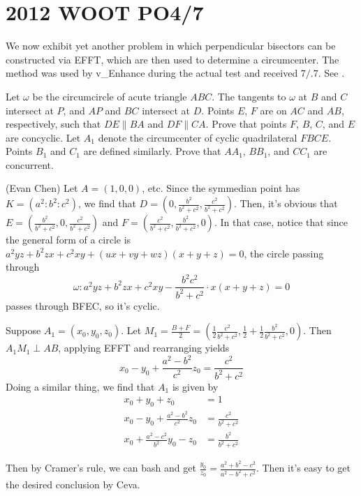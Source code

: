 \section{2012 WOOT PO4/7}
\label{exam:2012wootpo47}
We now exhibit yet another problem in which perpendicular bisectors can be constructed via EFFT, which are then used to determine a circumcenter.  The method was used by v\_Enhance during the actual test and received $7/.7$.  See \cite{woot}.

\secps
\begin{problem}[2012 WOOT PO4/7]
  Let $\omega$ be the circumcircle of acute triangle $ABC$.  The tangents to $\omega$ at $B$ and $C$ intersect at $P$, and $AP$ and $BC$ intersect at $D$.  Points $E$, $F$ are on $AC$ and $AB$, respectively, such that $DE \parallel BA$ and $DF \parallel CA$.
  \be[(a)]
  \ii Prove that points $F$, $B$, $C$, and $E$ are concyclic.
  \ii Let $A_1$ denote the circumcenter of cyclic quadrilateral $FBCE$.  Points $B_1$ and $C_1$ are defined similarly.  Prove that $AA_1$, $BB_1$, and $CC_1$ are concurrent.
  \ee
\end{problem}


\begin{soln}
  (Evan Chen) Let $A=(1,0,0)$, etc.  Since the symmedian point has $K = (a^2:b^2:c^2)$, we find that $D = \left(0, \frac{b^2}{b^2+c^2}, \frac{c^2}{b^2+c^2} \right)$.  Then, it's obvious that $E = \left( \frac{b^2}{b^2+c^2}, 0, \frac{c^2}{b^2+c^2} \right)$ and $F = \left( \frac{c^2}{b^2+c^2}, \frac{b^2}{b^2+c^2}, 0 \right)$.  In that case, notice that since the general form of a circle is $a^2yz + b^2zx + c^2xy + (ux + vy + wz)(x+y+z) = 0$, the circle passing through \[ \omega: a^2yz + b^2zx + c^2xy - \frac{b^2c^2}{b^2+c^2} \cdot x(x+y+z) =0 \] passes through BFEC, so it's cyclic.

Suppose $A_1 = (x_0, y_0, z_0)$.  Let $M_1 = \frac{B+F}{2} = \left( \frac{1}{2} \frac{c^2}{b^2+c^2}, \frac{1}{2} + \frac12 \frac{b^2}{b^2+c^2}, 0 \right)$.  Then $A_1M_1 \perp AB$, applying EFFT and rearranging yields \[ x_0 - y_0 + \frac{a^2-b^2}{c^2} z_0 = \frac{c^2}{b^2+c^2} \]
Doing a similar thing, we find that $A_1$ is given by
\begin{align*}
x_0 + y_0 + z_0 &= 1 \\
x_0 - y_0 + \frac{a^2-b^2}{c^2} z_0 &= \frac{c^2}{b^2+c^2} \\
x_0 + \frac{a^2-c^2}{b^2} y_0 - z_0 &= \frac{b^2}{b^2+c^2}
\end{align*}

Then by Cramer's rule, we can bash and get $\frac{y_0}{z_0} = \frac{a^2+b^2-c^2}{a^2-b^2+c^2}$.  Then it's easy to get the desired conclusion by Ceva.
\end{soln}

